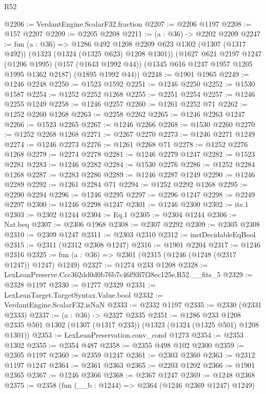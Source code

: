 \begin{lexlean}{R52}
\begin{coremodule}
@2206 := VerdantEngine.ScalarF32.fraction
@2207 := @2206 @1197
@2208 := @157 @2207
@2209 := @2205 @2208
@2211 := (a : @36) -> @2202 @2209
@2247 := fun (a : @36) =>
  @1286
    @492
    @1208
    @2209
    @623
    @1302
    (@1307 (@1317 @492))
    (@1323 (@1324 (@1325 @623) @1208 @1301))
    (@1627
      @621
      @2197
      @1247
      (@1206 @1995)
      (@157 (@1643 @1992 @44))
      (@1345 @616 @1247 @1957 @1205 @1995 @1362 @2187)
      (@1895 @1992 @44))
@2248 := @1901 @1965
@2249 := @1246 @2248
@2250 := @1523 @1592
@2251 := @1246 @2250
@2252 := @1530 @1587
@2254 := @1252 @2252 @1268
@2255 := @2251 @2254
@2257 := @1246 @2255 @1249
@2258 := @1246 @2257
@2260 := @1261 @2252 @71
@2262 := @1252 @2260 @1268
@2263 := @2258 @2262
@2265 := @1246 @2263 @1247
@2266 := @1523 @2265
@2267 := @1246 @2266
@2268 := @1530 @2260
@2270 := @1252 @2268 @1268
@2271 := @2267 @2270
@2273 := @1246 @2271 @1249
@2274 := @1246 @2273
@2276 := @1261 @2268 @71
@2278 := @1252 @2276 @1268
@2279 := @2274 @2278
@2281 := @1246 @2279 @1247
@2282 := @1523 @2281
@2283 := @1246 @2282
@2284 := @1530 @2276
@2286 := @1252 @2284 @1268
@2287 := @2283 @2286
@2289 := @1246 @2287 @1249
@2290 := @1246 @2289
@2292 := @1261 @2284 @71
@2294 := @1252 @2292 @1268
@2295 := @2290 @2294
@2296 := @1246 @2295
@2297 := @2296 @1247
@2298 := @2249 @2297
@2300 := @1246 @2298 @1247
@2301 := @1246 @2300
@2302 := ite.{1}
@2303 := @2302 @1244
@2304 := Eq.{1}
@2305 := @2304 @1244
@2306 := Nat.beq
@2307 := @2306 @1968
@2308 := @2307 @2292
@2309 := @2305 @2308
@2310 := @2309 @1247
@2311 := @2303 @2310
@2312 := instDecidableEqBool
@2315 := @2311 (@2312 @2308 @1247)
@2316 := @1901 @2204
@2317 := @1246 @2316
@2325 := fun (a : @36) => @2301 (@2315 (@1246 (@1248 (@2317 @1247)) @1247) @1249)
@2327 := @1274 @233 @1208
@2328 := LexLeanPreserve.Ccc362dd0d0b76b7c46f93f7f38ec125e.R52.__fits_5
@2329 := @2328 @1197
@2330 := @1277 @2329
@2331 := LexLeanTarget.TargetSyntax.Value.bool
@2332 := VerdantEngine.ScalarF32.isNaN
@2333 := @2332 @1197
@2335 := @2330 (@2331 @2333)
@2337 := (a : @36) -> @2327 @2335
@2351 := @1286
    @233
    @1208
    @2335
    @501
    @1302
    (@1307 (@1317 @233))
    (@1323 (@1324 (@1325 @501) @1208 @1301))
@2353 := LexLeanPreservation.conv_cond @1273
@2354 := @2353 @1302
@2355 := @2354 @487
@2358 := @2355 @498 @102 @2300
@2359 := @2305 @1197
@2360 := @2359 @1247
@2361 := @2303 @2360
@2363 := @2312 @1197 @1247
@2364 := @2361 @2363
@2365 := @2203 @1202
@2366 := @1901 @2365
@2367 := @1246 @2366
@2368 := @2367 @1247
@2369 := @1248 @2368
@2375 := @2358 (fun (__b : @1244) => @2364 (@1246 @2369 @1247) @1249)

\end{coremodule}
\end{lexlean}
